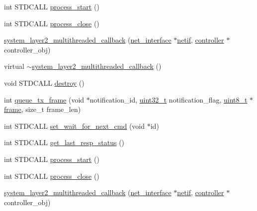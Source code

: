 \begin{DoxyCompactItemize}
\item 
int S\+T\+D\+C\+A\+LL \hyperlink{classavdecc__lib_1_1system__layer2__multithreaded__callback_a7cdc6ee6ffa37cab6b8e9fe82174ca7d}{process\+\_\+start} ()
\item 
int S\+T\+D\+C\+A\+LL \hyperlink{classavdecc__lib_1_1system__layer2__multithreaded__callback_ac508c1f6e533b4d9c26562223a4904da}{process\+\_\+close} ()
\item 
\hyperlink{classavdecc__lib_1_1system__layer2__multithreaded__callback_ad2564e57026870ea970297f966d48217}{system\+\_\+layer2\+\_\+multithreaded\+\_\+callback} (\hyperlink{classavdecc__lib_1_1net__interface}{net\+\_\+interface} $\ast$\hyperlink{structnetif}{netif}, \hyperlink{classavdecc__lib_1_1controller}{controller} $\ast$controller\+\_\+obj)
\item 
virtual \hyperlink{classavdecc__lib_1_1system__layer2__multithreaded__callback_a5568a082fc91a8afb91d4b1982d816fc}{$\sim$system\+\_\+layer2\+\_\+multithreaded\+\_\+callback} ()
\item 
void S\+T\+D\+C\+A\+LL \hyperlink{classavdecc__lib_1_1system__layer2__multithreaded__callback_a644cfaa829dbec5c28d5d29a6789e8c4}{destroy} ()
\item 
int \hyperlink{classavdecc__lib_1_1system__layer2__multithreaded__callback_aafc8f2310bf0212d84b7bf71d6aa56bb}{queue\+\_\+tx\+\_\+frame} (void $\ast$notification\+\_\+id, \hyperlink{parse_8c_a6eb1e68cc391dd753bc8ce896dbb8315}{uint32\+\_\+t} notification\+\_\+flag, \hyperlink{stdint_8h_aba7bc1797add20fe3efdf37ced1182c5}{uint8\+\_\+t} $\ast$\hyperlink{gst__avb__playbin_8c_ac8e710e0b5e994c0545d75d69868c6f0}{frame}, size\+\_\+t frame\+\_\+len)
\item 
int S\+T\+D\+C\+A\+LL \hyperlink{classavdecc__lib_1_1system__layer2__multithreaded__callback_a278bd918301de3c19d22e7d1d906f159}{set\+\_\+wait\+\_\+for\+\_\+next\+\_\+cmd} (void $\ast$id)
\item 
int S\+T\+D\+C\+A\+LL \hyperlink{classavdecc__lib_1_1system__layer2__multithreaded__callback_ac0f9c7a224fa2168344a9a819bba69f9}{get\+\_\+last\+\_\+resp\+\_\+status} ()
\item 
int S\+T\+D\+C\+A\+LL \hyperlink{classavdecc__lib_1_1system__layer2__multithreaded__callback_a7cdc6ee6ffa37cab6b8e9fe82174ca7d}{process\+\_\+start} ()
\item 
int S\+T\+D\+C\+A\+LL \hyperlink{classavdecc__lib_1_1system__layer2__multithreaded__callback_ac508c1f6e533b4d9c26562223a4904da}{process\+\_\+close} ()
\item 
\hyperlink{classavdecc__lib_1_1system__layer2__multithreaded__callback_ad2564e57026870ea970297f966d48217}{system\+\_\+layer2\+\_\+multithreaded\+\_\+callback} (\hyperlink{classavdecc__lib_1_1net__interface}{net\+\_\+interface} $\ast$\hyperlink{structnetif}{netif}, \hyperlink{classavdecc__lib_1_1controller}{controller} $\ast$controller\+\_\+obj)

\end{DoxyCompactItemize}
